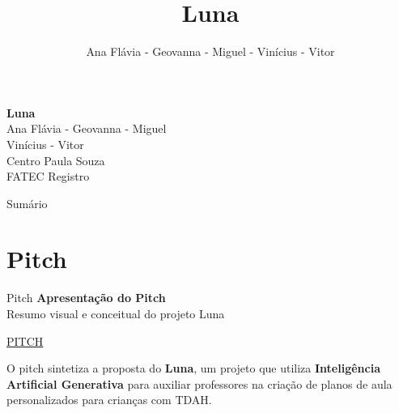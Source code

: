 \documentclass{beamer}
\title[Apresentação do projeto Luna]{\textbf{ Luna }}
\author{Ana Flávia - Geovanna - Miguel - Vinícius - Vitor}
\date{}
\begin{document}
\begin{frame}
    \centering
    \centering
    \vspace{1cm}
    {\color{cpsred}\Huge\textbf{Luna}}\\[0.8cm]
    {\Large Ana Flávia - Geovanna - Miguel}\\[0.4cm]
    {\Large Vinícius - Vitor}\\[0.4cm]
    \textcolor{cpsgray}{Centro Paula Souza}\\[0.2cm]
    \textcolor{cpsgray}{FATEC Registro}
\end{frame}

\begin{frame}{Sumário}
\tableofcontents
\end{frame}


\section{Pitch}
\begin{frame}{Pitch}
\centering
{\Large\textbf{\textcolor{cpsred}{Apresentação do Pitch}}}\\[0.4cm]
\textcolor{cpsgray}{Resumo visual e conceitual do projeto Luna}\\[0.8cm]
\vspace{0.3cm}

\begin{center}
\begin{tcolorbox}[
    enhanced,
    colback=white,
    colframe=cpsred,
    boxrule=1pt,
    arc=6pt,
    width=0.7\linewidth,
    center,
    halign=center,
    valign=center,
    shadow={0mm}{-0.5mm}{0mm}{cpsgray!30},
    top=10pt,
    bottom=10pt
]
\centering
\large
\href{https://www.youtube.com/watch?v=s2I0XjJmF1Y}{PITCH}
\end{tcolorbox}
\end{center}
\vspace{1cm}

\centering
{\small O pitch sintetiza a proposta do \textbf{Luna}, um projeto que utiliza \textbf{Inteligência Artificial Generativa} para auxiliar professores na criação de planos de aula personalizados para crianças com TDAH.}

\end{frame}

\end{document}
